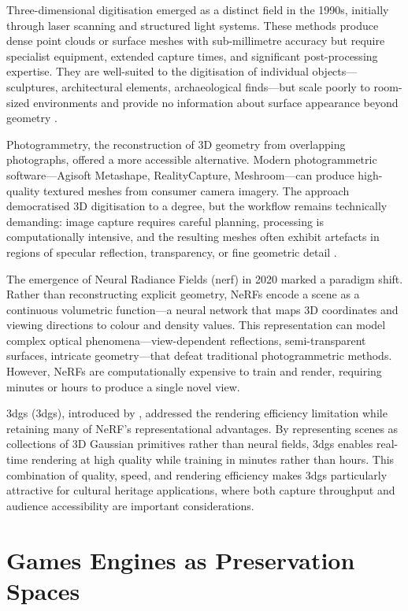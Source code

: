 Three-dimensional digitisation emerged as a distinct field in the 1990s, initially through laser scanning and structured light systems. These methods produce dense point clouds or surface meshes with sub-millimetre accuracy but require specialist equipment, extended capture times, and significant post-processing expertise. They are well-suited to the digitisation of individual objects---sculptures, architectural elements, archaeological finds---but scale poorly to room-sized environments and provide no information about surface appearance beyond geometry \parencite{Remondino2011}.

Photogrammetry, the reconstruction of 3D geometry from overlapping photographs, offered a more accessible alternative. Modern photogrammetric software---Agisoft Metashape, RealityCapture, Meshroom---can produce high-quality textured meshes from consumer camera imagery. The approach democratised 3D digitisation to a degree, but the workflow remains technically demanding: image capture requires careful planning, processing is computationally intensive, and the resulting meshes often exhibit artefacts in regions of specular reflection, transparency, or fine geometric detail \parencite{Nocerino2017}.

The emergence of Neural Radiance Fields (\acrshort{nerf}) in 2020 \parencite{Mildenhall2020} marked a paradigm shift. Rather than reconstructing explicit geometry, NeRFs encode a scene as a continuous volumetric function---a neural network that maps 3D coordinates and viewing directions to colour and density values. This representation can model complex optical phenomena---view-dependent reflections, semi-transparent surfaces, intricate geometry---that defeat traditional photogrammetric methods. However, NeRFs are computationally expensive to train and render, requiring minutes or hours to produce a single novel view.

\acrlong{3dgs} (\acrshort{3dgs}), introduced by \textcite{Kerbl2023}, addressed the rendering efficiency limitation while retaining many of NeRF's representational advantages. By representing scenes as collections of 3D Gaussian primitives rather than neural fields, \acrshort{3dgs} enables real-time rendering at high quality while training in minutes rather than hours. This combination of quality, speed, and rendering efficiency makes \acrshort{3dgs} particularly attractive for cultural heritage applications, where both capture throughput and audience accessibility are important considerations.

\section{Games Engines as Preservation Spaces}
\label{sec:bg-engines}

